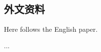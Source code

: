 
\setlength{\parskip}{18pt}
\chapter*{\centering\hei{}}
\setlength{\parskip}{18pt}
\setlength{\parskip}{0pt}


\section*{外文资料}

Here follows the English paper.

... 
